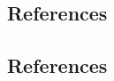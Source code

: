 \documentclass[dissertation]{uathesis}
\begin{document}
\begin{refsection} %

\newpage
\section{References}
\begin{singlespace}
\printbibliography[heading=none] %
\end{singlespace}
\end{refsection}



\begin{refsection} %

\newpage
\section{References}
\begin{singlespace}
\printbibliography[heading=none] %
\end{singlespace}
\end{refsection}
\end{document}
